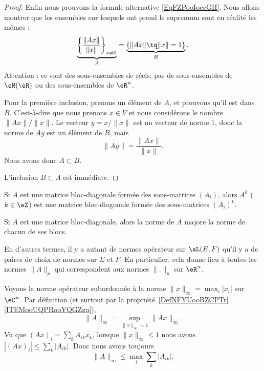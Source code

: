 \begin{proof}
	Enfin nous prouvons la formule alternative \eqref{EqFZPooIoecGH}. Nous allons montrer que les ensembles sur lesquels ont prend le supremum sont en réalité les mêmes :
	\begin{equation}
		\underbrace{\left\{ \frac{ \| Ax \| }{ \| x \| }\right\}_{x\neq 0}}_{A}=\underbrace{\left\{ \| Ax \|\tq \| x \|=1 \right\}}_{B}.
	\end{equation}
	Attention : ce sont des sous-ensembles de réels; pas de sous-ensembles de \( \eM(\eR)\) ou des sous-ensembles de \( \eR^n\).

	Pour la première inclusion, prenons un élément de \( A\), et prouvons qu'il est dans \( B\). C'est-à-dire que nous prenons \( x\in V\) et nous considérons le nombre \( \| Ax \|/\| x \|\). Le vecteur \( y=x/\| x \|\) est un vecteur de norme \( 1\), donc la norme de \( Ay\) est un élément de \( B\), mais
	\begin{equation}
		\| Ay \|=\frac{ \| Ax \| }{ \| x \| }.
	\end{equation}
	Nous avons donc \( A\subset B\).

	L'inclusion \( B\subset A\) est immédiate.
\end{proof}

\begin{lemma}       \label{LEMooHGCKooBzfAtg}
	Si \( A\) est une matrice bloc-diagonale formée des sous-matrices \( (A_i)\), alors \( A^k\) (\( k\in \eZ\)) est une matrice bloc-diagonale formée des sous-matrices \( (A_i)^k\).
\end{lemma}

\begin{proposition}      \label{PROPooJUYCooHnlFef}
	Si \( A\) est une matrice bloc-diagonale, alors la norme de \( A\) majore la norme de chacun de ses blocs.
\end{proposition}

En d'autres termes, il y a autant de normes opérateur sur \( \aL(E,F)\) qu'il y a de paires de choix de normes sur \( E\) et \( F\). En particulier, cela donne lieu à toutes les normes \( \| A \|_p\) qui correspondent aux normes \( \| . \|_p\) sur \( \eR^n\).

\begin{example}     \label{EXooXPXAooYyBwMX}
	Voyons la norme opérateur subordonnée à la norme \( \| x \|_{\infty}=\max_i| x_i |\) sur \( \eC^n\). Par définition (et surtout par la propriété~\ref{DefNFYUooBZCPTr}\ref{ITEMooUQPRooYQGZzu}),
	\begin{equation}
		\| A \|_{\infty}=\sup_{\| x \|_{\infty}=1}\| Ax \|_{\infty}.
	\end{equation}
	Vu que \( (Ax)_i=\sum_kA_{ik}x_k\), lorsque \( \| x \|_{\infty}\leq 1\) nous avons \( | (Ax)_i |\leq \sum_k| A_{ik} |\). Donc nous avons toujours
	\begin{equation}        \label{EQooPLCIooVghasD}
		\| A \|_{\infty}\leq \max_i\sum_{k}| A_{ik} |.
	\end{equation}
\end{example}

